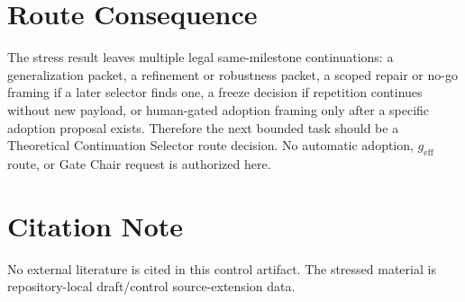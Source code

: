 \documentclass[11pt]{article}
\newcommand{\geff}{g_{\mathrm{eff}}}
\begin{document}
\section{Route Consequence}

The stress result leaves multiple legal same-milestone continuations: a
generalization packet, a refinement or robustness packet, a scoped repair or
no-go framing if a later selector finds one, a freeze decision if repetition
continues without new payload, or human-gated adoption framing only after a
specific adoption proposal exists. Therefore the next bounded task should be
a Theoretical Continuation Selector route decision. No automatic adoption,
\(\geff\) route, or Gate Chair request is authorized here.

\section*{Citation Note}

No external literature is cited in this control artifact. The stressed
material is repository-local draft/control source-extension data.
\end{document}

